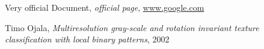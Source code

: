 \begin{thebibliography}{99999}
\singlespace\normalsize

 Very official Document, \textit{ official page}, \url{www.google.com}


 Timo Ojala, \textit{Multiresolution gray-scale and rotation invariant texture classification with local binary patterns}, 2002

\end{thebibliography}
